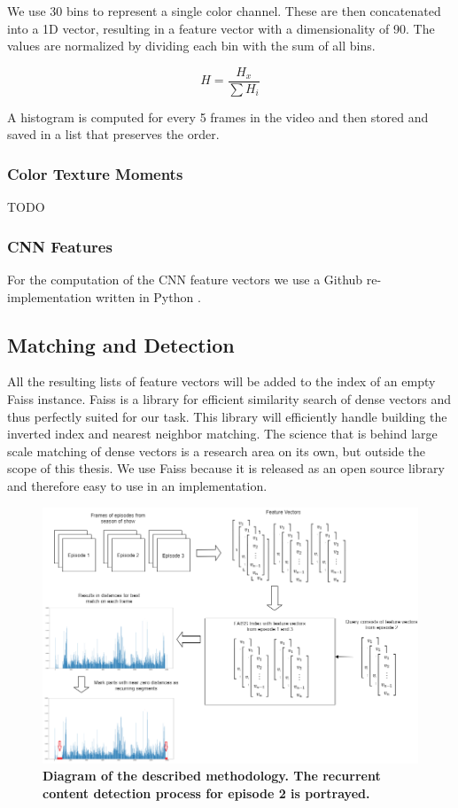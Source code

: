 \documentclass{article}
\begin{document}
We use 30 bins to represent a single color channel. These are then concatenated into a 1D vector, resulting in a feature vector with a dimensionality of 90. The values are normalized by dividing each bin with the sum of all bins.

\[H = \frac{H_x}{\sum H_i} \]

A histogram is computed for every 5 frames in the video and then stored and saved in a list that preserves the order.

\subsubsection{Color Texture Moments}
TODO

\subsubsection{CNN Features}
For the computation of the CNN feature vectors we use a Github re-implementation written in Python \cite{rmac-github}.


\subsection{Matching and Detection}

All the resulting lists of feature vectors will be added to the index of an empty Faiss instance. Faiss is a library for efficient similarity search of dense vectors \cite{faiss, faiss-github} and thus perfectly suited for our task. This library will efficiently handle building the inverted index and nearest neighbor matching. The science that is behind large scale matching of dense vectors is a research area on its own, but outside the scope of this thesis. We use Faiss because it is released as an open source library and therefore easy to use in an implementation.

\begin{figure}[H]
	\includegraphics[width=\paperwidth, center, scale=0.7]{images/thesisdiagram.png}
	\centering
	\caption{\textbf{Diagram of the described methodology. The recurrent content detection process for episode 2 is portrayed.}}
	\label{fig:diagram}
\end{figure}
\end{document}
